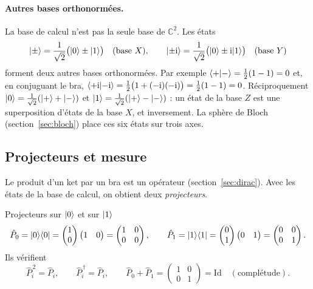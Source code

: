 \paragraph{Autres bases orthonormées.} La base de calcul n'est pas la seule base de $\mathbb{C}^2$.
Les états
\[
  |\pm\rangle=\frac{1}{\sqrt2}\big(|0\rangle\pm|1\rangle\big)\quad(\text{base }X),\qquad
  |{\pm}\mathrm{i}\rangle=\frac{1}{\sqrt2}\big(|0\rangle\pm\mathrm{i}|1\rangle\big)\quad(\text{base }Y)
\]
forment deux autres bases orthonormées. Par exemple $\langle +|-\rangle=\frac12(1-1)=0$ et, en
conjuguant le bra, $\langle {+}\mathrm{i}|{-}\mathrm{i}\rangle=\frac12\big(1+(-\mathrm{i})(-\mathrm{i})\big)=\frac12(1-1)=0$.
Réciproquement $|0\rangle=\frac{1}{\sqrt2}(|+\rangle+|-\rangle)$ et
$|1\rangle=\frac{1}{\sqrt2}(|+\rangle-|-\rangle)$ : un état de la base $Z$ est une superposition d'états
de la base $X$, et inversement. La sphère de Bloch (section~\ref{sec:bloch}) place ces six états sur
trois axes.

\subsection{Projecteurs et mesure}\label{sec:projecteurs}

Le produit d'un ket par un bra est un opérateur (section~\ref{sec:dirac}). Avec les
états de la base de calcul, on obtient deux \emph{projecteurs}.

\begin{definition}{Projecteurs sur $|0\rangle$ et sur $|1\rangle$}
\[
  \hat P_0=|0\rangle\langle 0|=\begin{pmatrix}1\\ 0\end{pmatrix}\begin{pmatrix}1 & 0\end{pmatrix}
  =\begin{pmatrix}1 & 0\\ 0 & 0\end{pmatrix},
  \qquad
  \hat P_1=|1\rangle\langle 1|=\begin{pmatrix}0\\ 1\end{pmatrix}\begin{pmatrix}0 & 1\end{pmatrix}
  =\begin{pmatrix}0 & 0\\ 0 & 1\end{pmatrix}.
\]
Ils vérifient
\[
  \hat P_i^{\,2}=\hat P_i,
  \qquad
  \hat P_i^{\,\dagger}=\hat P_i,
  \qquad
  \hat P_0+\hat P_1=\begin{pmatrix}1 & 0\\ 0 & 1\end{pmatrix}=\mathrm{Id}
  \quad(\text{complétude}).
\]
\end{definition}

